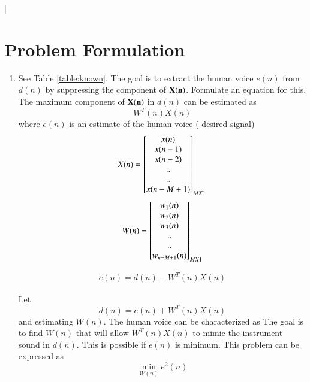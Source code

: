 |\documentclass[journal,12pt,twocolumn]{IEEEtran}
\renewcommand\thesection{\arabic{section}}
\begin{document}
\section{Problem Formulation}
\begin{enumerate}[label=\thesection.\arabic*
,ref=\thesection.\theenumi]

\item See Table \ref{table:known}.  The goal is to extract the human voice $e(n)$ from $d(n)$ by suppressing the component of $\mathbf{X(n)}$.  Formulate 
an equation for this.
\\
\solution The  maximum component of $\mathbf{X(n)}$ in $d(n)$ can be estimated as
\begin{equation}
W^{T}(n)X(n)
\end{equation}
		where $e(n)$ is an estimate of the human voice ( desired signal) 
\begin{align}
 X(n)
 =
  \begin{bmatrix}
   x(n) \\ x(n-1)\\
   x(n-2) \\ $..$ \\ $..$ \\ x(n-M+1)  \end{bmatrix}_{M X 1}
\end{align}
\begin{align}
 W(n)
 =
  \begin{bmatrix}
   w_1(n) \\ w_2(n)\\
   w_3(n) \\ $..$ \\ $..$ \\ w_{n-M+1}(n)  \end{bmatrix}_{M X 1}
\end{align}

\begin{align}
\label{eq:error}
e(n) = d(n)-W^{T}(n)X(n)
\end{align}
%

%
\begin{table}[!ht]
\centering
\small

\caption{}
\label{table:known}
\end{table}
Let
\begin{equation}
d(n) = e(n) + W^{T}(n)X(n)
\end{equation}
and estimating $W(n)$.
The human voice can be characterized as
%
%
The goal is to find $W(n)$ that will allow $W^{T}(n)X(n)$ to mimic the instrument sound in $d(n)$.
This is possible if $e(n)$ is minimum. This problem can be expressed as
\begin{equation}
\label{eq:prob_mse}
\min_{W(n)}e^{2}(n)
\end{equation}
%
\end{enumerate}
\end{document}

